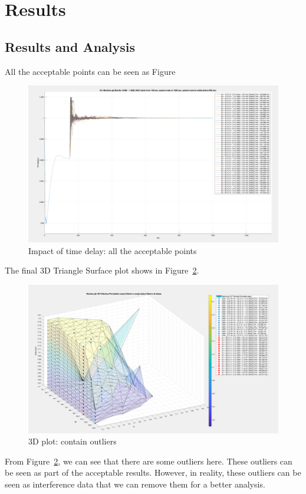 \section{Results} %
\subsection{Results and Analysis} %
\label{subsection5.4.1}

All the acceptable points can be seen as Figure~

\begin{figure}[htbp]
\centering
\includegraphics[width = .819\textwidth]{figure/5_4_1_i.png}
\caption{Impact of time delay: all the acceptable points}
\label{5_4_1_i}
\end{figure}


The final 3D Triangle Surface plot shows in Figure~\ref{5_4_1_Outlier}. 

\begin{figure}[htbp]
\centering
\includegraphics[width = .819\textwidth]{figure/5_4_1_Outlier.png}
\caption{3D plot: contain outliers}
\label{5_4_1_Outlier}
\end{figure}

From Figure~\ref{5_4_1_Outlier}, we can see that there are some outliers here. These outliers can be seen as part of the acceptable results. However, in reality, these outliers can be seen as interference data that we can remove them for a better analysis.\\

